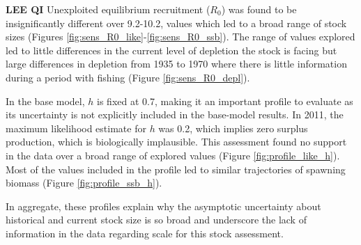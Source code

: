 \documentclass[11pt,
  english,
  a4paper,
]{article}
\begin{document}

\textbf{LEE QI} Unexploited equilibrium recruitment ({\(R_0\)\leavevmode\tagmcend\tagstructend}) was found to be insignificantly different over 9.2-10.2, values which led to a broad range of stock sizes (Figures \ref{fig:sens_R0_like}-\ref{fig:sens_R0_ssb}). The range of values explored led to little differences in the current level of depletion the stock is facing but large differences in depletion from 1935 to 1970 where there is little information during a period with fishing (Figure \ref{fig:sens_R0_depl}).

\leavevmode\tagmcend\tagstructend\par

In the base model, {\(h\)\leavevmode\tagmcend\tagstructend} is fixed at 0.7, making it an important profile to evaluate as its uncertainty is not explicitly included in the base-model results. In 2011, the maximum likelihood estimate for {\(h\)\leavevmode\tagmcend\tagstructend} was 0.2, which implies zero surplus production, which is biologically implausible. This assessment found no support in the data over a broad range of explored values (Figure \ref{fig:profile_like_h}). Most of the values included in the profile led to similar trajectories of spawning biomass (Figure \ref{fig:profile_ssb_h}).

In aggregate, these profiles explain why the asymptotic uncertainty about historical and current stock size is so broad and underscore the lack of information in the data regarding scale for this stock assessment.

\leavevmode\tagmcend\tagstructend\par

\end{document}
